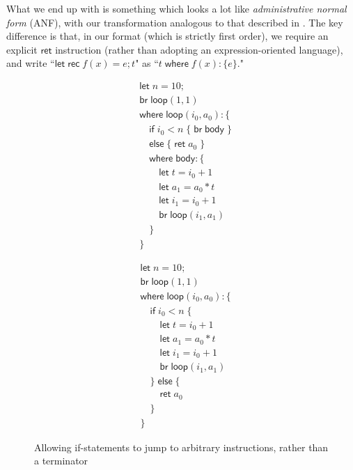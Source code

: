 \documentclass[acmsmall,screen,review]{acmart}
\newcommand{\ms}[1]{\ensuremath{\mathsf{#1}}}
\begin{document}
What we end up with is something which looks a lot like
\textit{administrative normal form} (ANF), with our transformation analogous to that described in
\citet{chakravarty-functional-ssa-2003}. The key difference is that, in our format (which is
strictly first order), we require an explicit \ms{ret} instruction (rather than adopting an expression-oriented language), and write ``$\ms{let\;rec}\;f(x) = e; t$" as ``$t\;\ms{where}\;f(x) : \{e\}$."

\begin{figure}
  \centering
  \begin{subfigure}[t]{.5\textwidth}
    \begin{align*}
      & \ms{let}\;n = 10; \\
      & \ms{br}\;\ms{loop}(1, 1) \\
      & \ms{where}\;\ms{loop}(i_0, a_0): \{ \\
      & \quad \ms{if}\;i_0 < n\;\{\;\ms{br}\;\ms{body}\;\} \\
      & \quad \ms{else}\;\{\;\ms{ret}\;a_0\;\} \\
      & \quad \ms{where}\;\ms{body}: \{\\ 
      & \qquad \ms{let}\;t = i_0 + 1 \\
      & \qquad \ms{let}\;a_1 = a_0 * t \\
      & \qquad \ms{let}\;i_1 = i_0 + 1 \\
      & \qquad \ms{br}\;\ms{loop}(i_1, a_1) \\
      & \quad \} \\
      & \}
    \end{align*}
  \end{subfigure}%
  \begin{subfigure}[t]{.5\textwidth}
    \begin{align*}
      & \ms{let}\;n = 10; \\
      & \ms{br}\;\ms{loop}(1, 1) \\
      & \ms{where}\;\ms{loop}(i_0, a_0): \{\\
      & \quad \ms{if}\;i_0 < n\;\{ \\
      & \qquad \ms{let}\;t = i_0 + 1 \\
      & \qquad \ms{let}\;a_1 = a_0 * t \\
      & \qquad \ms{let}\;i_1 = i_0 + 1 \\
      & \qquad \ms{br}\;\ms{loop}(i_1, a_1) \\
      & \quad \}\;\ms{else}\;\{ \\
      & \qquad \ms{ret}\;a_0 \\
      & \quad \} \\
      & \}
    \end{align*}
  \end{subfigure}
  \caption{Allowing if-statements to jump to arbitrary instructions, rather than a terminator}
  \Description{}
  \label{fig:bba-to-anf}
\end{figure}
\end{document}
